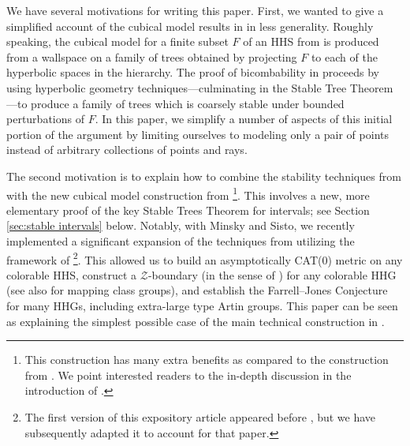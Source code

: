 \documentclass{amsart}
\theoremstyle{definition}
\theoremstyle{remark}
\theoremstyle{definition}
\newcommand{\calZ}{\mathcal{Z}}
\begin{document}


We have several motivations for writing this paper.  First, we wanted to give a simplified account of the cubical model results in \cite{DMS_bary, DMS_FJ} in less generality.  Roughly speaking, the cubical model for a finite subset $F$ of an HHS from \cite{HHS_quasi} is produced from a wallspace on a family of trees obtained by projecting $F$ to each of the hyperbolic spaces in the hierarchy.  The proof of bicombability in \cite{DMS_bary} proceeds by using hyperbolic geometry techniques---culminating in the Stable Tree Theorem \cite[Theorem 3.2]{DMS_bary}---to produce a family of trees which is coarsely stable under bounded perturbations of $F$.  In this paper, we simplify a number of aspects of this initial portion of the argument by limiting ourselves to modeling only a pair of points instead of arbitrary collections of points and rays.

The second motivation is to explain how to combine the stability techniques from \cite{DMS_bary} with the new cubical model construction from \cite{Dur_infcube}\footnote{This construction has many extra benefits as compared to the construction from \cite{HHS_quasi}.  We point interested readers to the in-depth discussion in the introduction of \cite{Dur_infcube}.}.  This involves a new, more elementary proof of the key Stable Trees Theorem for intervals; see Section \ref{sec:stable intervals} below.  Notably, with Minsky and Sisto, we recently \cite{DMS_FJ} implemented a significant expansion of the techniques from \cite{DMS_bary} utilizing the framework of \cite{Dur_infcube}\footnote{The first version of this expository article appeared before \cite{DMS_FJ}, but we have subsequently adapted it to account for that paper.}.  This allowed us to build an asymptotically CAT(0) metric \cite{Kar_asymp} on any colorable HHS, construct a $\calZ$-boundary (in the sense of \cite{bestvina1996local, Dra:BM_formula}) for any colorable HHG (see also \cite{hamenstadt2025z} for mapping class groups), and establish the Farrell--Jones Conjecture \cite{farrell1993isomorphism} for many HHGs, including extra-large type Artin groups.  This paper can be seen as explaining the simplest possible case of the main technical construction in \cite{DMS_FJ}.
\end{document}
